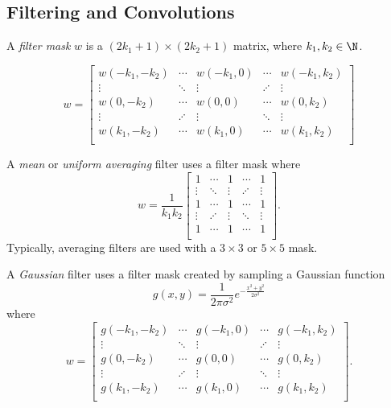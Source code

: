 \documentclass[12pt]{article}
\begin{document}
\subsection{Filtering and Convolutions}

\begin{defn}
    A \emph{filter mask} $w$ is a $(2k_1 + 1) \times (2k_2 + 1)$ matrix, where $k_1, k_2 \in \N$.

    \[w = \begin{bmatrix}
        w{(-k_1, -k_2)} & \cdots & w{(-k_1, 0)} & \cdots & w{(-k_1, k_2)} \\
        \vdots & \ddots & \vdots & \iddots & \vdots \\
        w{(0, -k_2)} & \cdots & w{(0, 0)} & \cdots & w{(0, k_2)} \\
        \vdots & \iddots & \vdots & \ddots & \vdots \\
        w{(k_1, -k_2)} & \cdots & w{(k_1, 0)} & \cdots & w{(k_1, k_2)} \\
    \end{bmatrix}\]
\end{defn}

\begin{exmp}
    A \emph{mean} or \emph{uniform averaging} filter uses a filter mask where
    \[w = \frac{1}{k_1k_2}\begin{bmatrix}
        1 & \cdots & 1 & \cdots & 1 \\
        \vdots & \ddots & \vdots & \iddots & \vdots \\
        1 & \cdots & 1 & \cdots & 1 \\
        \vdots & \iddots & \vdots & \ddots & \vdots \\
        1 & \cdots & 1 & \cdots & 1 \\
    \end{bmatrix}.\] Typically, averaging filters are used with a $3 \times 3$ or $5 \times 5$ mask.
\end{exmp}

\begin{exmp}
    A \emph{Gaussian} filter uses a filter mask created by sampling a Gaussian function \[g(x, y) = \frac{1}{2\pi\sigma^2}e^{-\frac{x^2+y^2}{2\sigma^2}}\] where
    \[w = \begin{bmatrix}
        g(-k_1, -k_2) & \cdots & g(-k_1, 0) & \cdots & g(-k_1, k_2) \\
        \vdots & \ddots & \vdots & \iddots & \vdots \\
        g(0, -k_2) & \cdots & g(0, 0) & \cdots & g(0, k_2) \\
        \vdots & \iddots & \vdots & \ddots & \vdots \\
        g(k_1, -k_2) & \cdots & g(k_1, 0) & \cdots & g(k_1, k_2) \\
    \end{bmatrix}.\]
\end{exmp}
\end{document}
